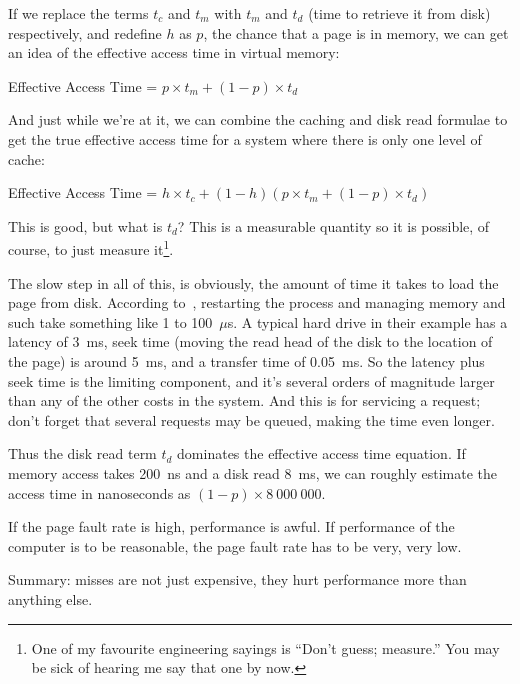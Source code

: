 \documentclass[a4paper]{report}
\begin{document}
If we replace the terms $t_{c}$ and $t_{m}$ with $t_{m}$ and $t_{d}$ (time to retrieve it from disk) respectively, and redefine $h$ as $p$, the chance that a page is in memory, we can get an idea of the effective access time in virtual memory: 

\begin{center}
	Effective Access Time = $ p \times t_{m} + (1 - p) \times t_{d}$
\end{center}

And just while we're at it, we can combine the caching and disk read formulae to get the true effective access time for a system where there is only one level of cache:

\begin{center}
	Effective Access Time = $ h \times t_{c} + (1 - h) ( p \times t_{m} + (1 - p) \times t_{d})$
\end{center}

This is good, but what is $t_{d}$? This is a measurable quantity so it is possible, of course, to just measure it\footnote{One of my favourite engineering sayings is ``Don't guess; measure.'' You may be sick of hearing me say that one by now.}.

The slow step in all of this, is obviously, the amount of time it takes to load the page from disk. According to~\cite{osc}, restarting the process and managing memory and such take something like 1 to 100~$\mu$s. A typical hard drive in their example has a latency of 3~ms, seek time (moving the read head of the disk to the location of the page) is around 5~ms, and a transfer time of 0.05~ms. So the latency plus seek time is the limiting component, and it's several orders of magnitude larger than any of the other costs in the system. And this is for servicing a request; don't forget that several requests may be queued, making the time even longer.

Thus the disk read term $t_{d}$ dominates the effective access time equation. If memory access takes 200~ns and a disk read 8~ms, we can roughly estimate the access time in nanoseconds as $(1-p) \times 8~000~000$. 

If the page fault rate is high, performance is awful. If performance of the computer is to be reasonable, the page fault rate has to be very, very low.

Summary: misses are not just expensive, they hurt performance more than anything else.
\end{document}
